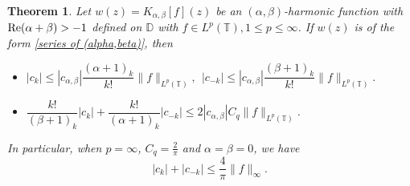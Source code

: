 \documentclass[11pt, reqno]{amsart}
\newtheorem{theorem}{Theorem}
\theoremstyle{definition}
\numberwithin{equation}{section}
\theoremstyle{remark}
\numberwithin{equation}{section}
\begin{document}
\begin{theorem}\label{t4}
	Let $w(z)=K_{\alpha,\beta}[f](z)$ be an $(\alpha,\beta)$-harmonic function with $\mbox{\rm Re}(\alpha+\beta)>-1$ defined on  $\mathbb{D}$  with $f\in L^p(\mathbb{T}),1\leq p\leq \infty$. If $w(z)$ is of the form \eqref{series of (alpha,beta)}, then 
	\begin{itemize}
		\item [(i)] $|c_k|\leq |c_{\alpha,\beta}|\dfrac{(\alpha+1)_{k}}{k!}\|f\|_{L^p(\mathbb{T})},\ \ |c_{-k}|\leq|c_{\alpha,\beta}|\dfrac{(\beta+1)_{k}}{k!}\|f\|_{L^p(\mathbb{T})}.$
		\item [(ii)]$\dfrac{k!}{(\beta+1)_{k}}|c_k|+\dfrac{k!}{(\alpha+1)_{k}}|c_{-k}|\leq 2|c_{\alpha,\beta}|C_q\|f\|_{L^p(\mathbb{T})}$.
	\end{itemize}
In particular, when $p=\infty$, $C_q=\frac{2}{\pi}$ and $\alpha=\beta=0$, we have $$|c_k|+|c_{-k}|\leq\frac{4}{\pi}\|f\|_{\infty}.$$
\end{theorem}
\end{document}
